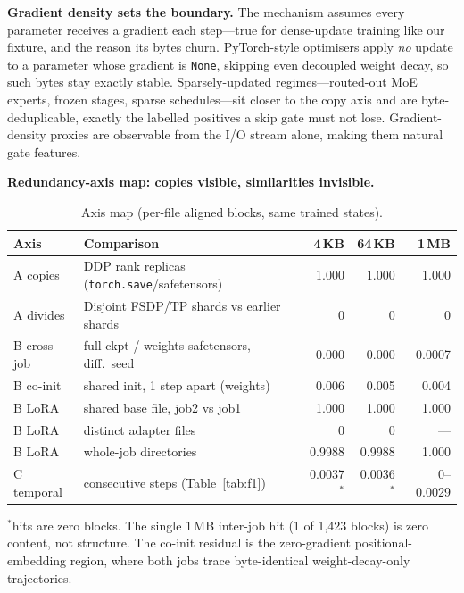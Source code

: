 \documentclass[sigconf,10pt,anonymous,review]{acmart}
\begin{document}
\noindent\textbf{Gradient density sets the boundary.}
The mechanism assumes every parameter receives a gradient each
step---true for dense-update training like our fixture, and the reason
its bytes churn. PyTorch-style optimisers apply \emph{no} update to a
parameter whose gradient is \texttt{None}, skipping even decoupled
weight decay, so such bytes stay exactly stable. Sparsely-updated
regimes---routed-out MoE experts, frozen stages, sparse schedules---sit
closer to the copy axis and are byte-deduplicable, exactly the labelled
positives a skip gate must not lose. Gradient-density proxies are
observable from the I/O stream alone, making them natural gate features.

\noindent\textbf{Redundancy-axis map: copies visible, similarities invisible.}
\label{sec:axismap}
\begin{table}[t]
\caption{Axis map (per-file aligned blocks, same trained states).}
\label{tab:axismap}
\scriptsize
\setlength{\tabcolsep}{3.5pt}
\begin{tabular}{p{0.95cm}p{2.85cm}rrr}
\toprule
\textbf{Axis} & \textbf{Comparison} & \textbf{4\,KB} &
\textbf{64\,KB} & \textbf{1\,MB} \\
\midrule
A copies & DDP rank replicas (\texttt{torch.save}/safetensors) & 1.000 & 1.000 & 1.000 \\
A divides & Disjoint FSDP/TP shards vs earlier shards & 0 & 0 & 0 \\
B cross-job & full ckpt / weights safetensors, diff.\ seed & 0.000 & 0.000 & 0.0007 \\
B co-init & shared init, 1 step apart (weights) & 0.006 & 0.005 & 0.004 \\
B LoRA & shared base file, job2 vs job1 & 1.000 & 1.000 & 1.000 \\
B LoRA & distinct adapter files & 0 & 0 & --- \\
B LoRA & whole-job directories & 0.9988 & 0.9988 & 1.000 \\
C temporal & consecutive steps (Table~\ref{tab:f1}) & 0.0037$^*$ & 0.0036$^*$ & 0--0.0029 \\
\bottomrule
\end{tabular}

\vspace{2pt}
\footnotesize $^*$hits are zero blocks. The single 1\,MB inter-job hit
(1 of 1,423 blocks) is zero content, not structure. The co-init
residual is the zero-gradient positional-embedding region, where both
jobs trace byte-identical weight-decay-only trajectories.
\end{table}
\end{document}
